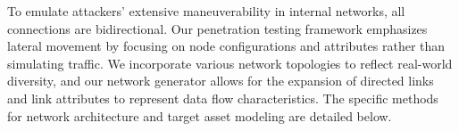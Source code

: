 To emulate attackers' extensive maneuverability in internal networks, all connections are bidirectional. Our penetration testing framework emphasizes lateral movement by focusing on node configurations and attributes rather than simulating traffic. We incorporate various network topologies to reflect real-world diversity, and our network generator allows for the expansion of directed links and link attributes to represent data flow characteristics. The specific methods for network architecture and target asset modeling are detailed below.








